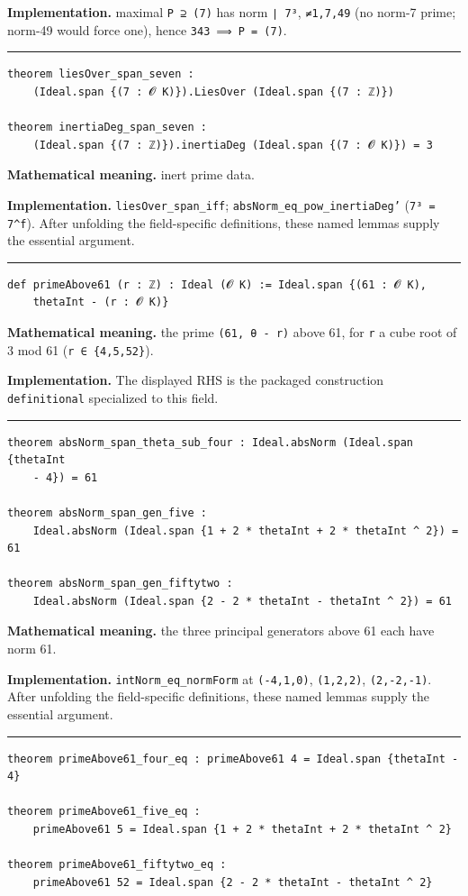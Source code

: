 \documentclass[UTF8,a4paper,11pt,fontset=fandol]{ctexart}
\theoremstyle{definition}
\newcommand{\statementsep}{\par\medskip\hrule\medskip}
\begin{document}
\noindent\textbf{Implementation.} maximal \texttt{P ⊇ (7)} has norm \texttt{∣ 7³}, \texttt{≠1,7,49} (no norm-7 prime; norm-49 would force one), hence \texttt{343 ⟹ P = (7)}.\par
\statementsep
\begin{verbatim}
theorem liesOver_span_seven :
    (Ideal.span {(7 : 𝓞 K)}).LiesOver (Ideal.span {(7 : ℤ)})

theorem inertiaDeg_span_seven :
    (Ideal.span {(7 : ℤ)}).inertiaDeg (Ideal.span {(7 : 𝓞 K)}) = 3
\end{verbatim}
\noindent\textbf{Mathematical meaning.} inert prime data.\par
\noindent\textbf{Implementation.} \texttt{liesOver\_\allowbreak{}span\_\allowbreak{}iff}; \texttt{absNorm\_\allowbreak{}eq\_\allowbreak{}pow\_\allowbreak{}inertiaDeg'} (\texttt{7³ = 7\textasciicircum{}f}). After unfolding the field-specific definitions, these named lemmas supply the essential argument.\par
\statementsep
\begin{verbatim}
def primeAbove61 (r : ℤ) : Ideal (𝓞 K) := Ideal.span {(61 : 𝓞 K),
    thetaInt - (r : 𝓞 K)}
\end{verbatim}
\noindent\textbf{Mathematical meaning.} the prime \texttt{(61, θ - r)} above 61, for \texttt{r} a cube root of 3 mod 61 (\texttt{r ∈ \{4,5,52\}}).\par
\noindent\textbf{Implementation.} The displayed RHS is the packaged construction \texttt{definitional} specialized to this field.\par
\statementsep
\begin{verbatim}
theorem absNorm_span_theta_sub_four : Ideal.absNorm (Ideal.span {thetaInt
    - 4}) = 61

theorem absNorm_span_gen_five :
    Ideal.absNorm (Ideal.span {1 + 2 * thetaInt + 2 * thetaInt ^ 2}) = 61

theorem absNorm_span_gen_fiftytwo :
    Ideal.absNorm (Ideal.span {2 - 2 * thetaInt - thetaInt ^ 2}) = 61
\end{verbatim}
\noindent\textbf{Mathematical meaning.} the three principal generators above 61 each have norm 61.\par
\noindent\textbf{Implementation.} \texttt{intNorm\_\allowbreak{}eq\_\allowbreak{}normForm} at \texttt{(-4,1,0)}, \texttt{(1,2,2)}, \texttt{(2,-2,-1)}. After unfolding the field-specific definitions, these named lemmas supply the essential argument.\par
\statementsep
\begin{verbatim}
theorem primeAbove61_four_eq : primeAbove61 4 = Ideal.span {thetaInt - 4}

theorem primeAbove61_five_eq :
    primeAbove61 5 = Ideal.span {1 + 2 * thetaInt + 2 * thetaInt ^ 2}

theorem primeAbove61_fiftytwo_eq :
    primeAbove61 52 = Ideal.span {2 - 2 * thetaInt - thetaInt ^ 2}
\end{verbatim}
\end{document}
